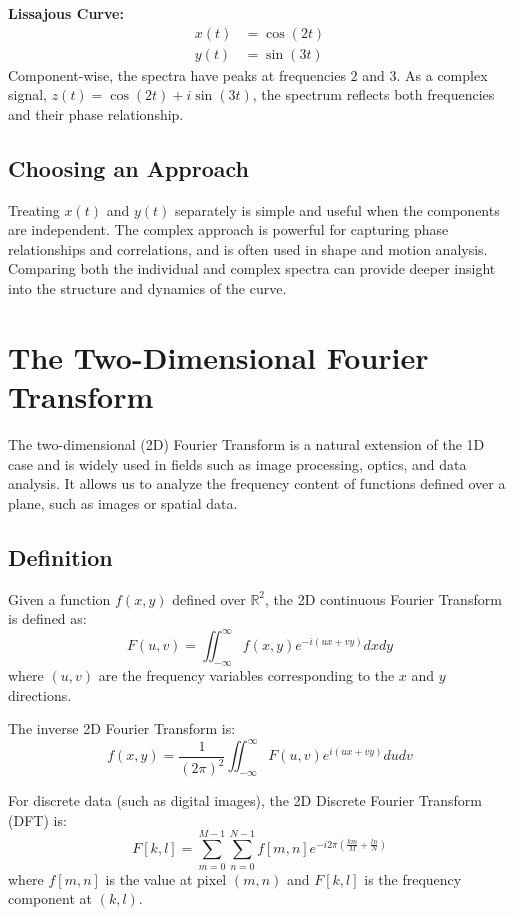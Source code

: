 \documentclass[11pt,a4paper]{article}
\begin{document}
\textbf{Lissajous Curve:}
\begin{align}
x(t) &= \cos(2t) \\
y(t) &= \sin(3t)
\end{align}
Component-wise, the spectra have peaks at frequencies $2$ and $3$. As a complex signal, $z(t) = \cos(2t) + i\sin(3t)$, the spectrum reflects both frequencies and their phase relationship.

\subsection{Choosing an Approach}

Treating $x(t)$ and $y(t)$ separately is simple and useful when the components are independent. The complex approach is powerful for capturing phase relationships and correlations, and is often used in shape and motion analysis. Comparing both the individual and complex spectra can provide deeper insight into the structure and dynamics of the curve.

\section{The Two-Dimensional Fourier Transform}

The two-dimensional (2D) Fourier Transform is a natural extension of the 1D case and is widely used in fields such as image processing, optics, and data analysis. It allows us to analyze the frequency content of functions defined over a plane, such as images or spatial data.

\subsection{Definition}

Given a function $f(x, y)$ defined over $\mathbb{R}^2$, the 2D continuous Fourier Transform is defined as:
\begin{equation}
F(u, v) = \iint_{-\infty}^{\infty} f(x, y) e^{-i(ux + vy)} dx dy
\end{equation}
where $(u, v)$ are the frequency variables corresponding to the $x$ and $y$ directions.

The inverse 2D Fourier Transform is:
\begin{equation}
f(x, y) = \frac{1}{(2\pi)^2} \iint_{-\infty}^{\infty} F(u, v) e^{i(ux + vy)} du dv
\end{equation}

For discrete data (such as digital images), the 2D Discrete Fourier Transform (DFT) is:
\begin{equation}
F[k, l] = \sum_{m=0}^{M-1} \sum_{n=0}^{N-1} f[m, n] e^{-i 2\pi (\frac{km}{M} + \frac{ln}{N})}
\end{equation}
where $f[m, n]$ is the value at pixel $(m, n)$ and $F[k, l]$ is the frequency component at $(k, l)$.
\end{document}

